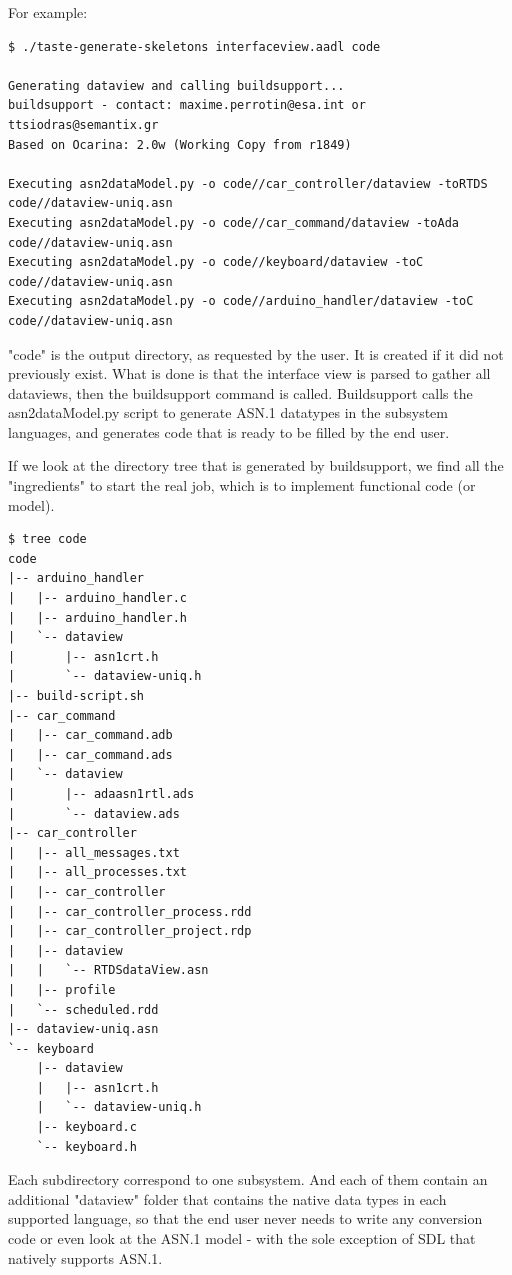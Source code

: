 \documentclass[11pt]{book}
\begin{document}
For example:

\begin{lstlisting}
$ ./taste-generate-skeletons interfaceview.aadl code

Generating dataview and calling buildsupport...
buildsupport - contact: maxime.perrotin@esa.int or ttsiodras@semantix.gr 
Based on Ocarina: 2.0w (Working Copy from r1849)

Executing asn2dataModel.py -o code//car_controller/dataview -toRTDS code//dataview-uniq.asn
Executing asn2dataModel.py -o code//car_command/dataview -toAda code//dataview-uniq.asn
Executing asn2dataModel.py -o code//keyboard/dataview -toC code//dataview-uniq.asn
Executing asn2dataModel.py -o code//arduino_handler/dataview -toC code//dataview-uniq.asn
\end{lstlisting}

"code" is the output directory, as requested by the user. It is created if it did not previously exist. What is done is that the interface view is parsed to gather all dataviews, then the buildsupport command is called. Buildsupport calls the asn2dataModel.py script to generate ASN.1 datatypes in the subsystem languages, and generates code that is ready to be filled by the end user.

If we look at the directory tree that is generated by buildsupport, we find all the "ingredients" to start the real job, which is to implement functional code (or model).

\begin{lstlisting}
$ tree code
code
|-- arduino_handler
|   |-- arduino_handler.c
|   |-- arduino_handler.h
|   `-- dataview
|       |-- asn1crt.h
|       `-- dataview-uniq.h
|-- build-script.sh
|-- car_command
|   |-- car_command.adb
|   |-- car_command.ads
|   `-- dataview
|       |-- adaasn1rtl.ads
|       `-- dataview.ads
|-- car_controller
|   |-- all_messages.txt
|   |-- all_processes.txt
|   |-- car_controller
|   |-- car_controller_process.rdd
|   |-- car_controller_project.rdp
|   |-- dataview
|   |   `-- RTDSdataView.asn
|   |-- profile
|   `-- scheduled.rdd
|-- dataview-uniq.asn
`-- keyboard
    |-- dataview
    |   |-- asn1crt.h
    |   `-- dataview-uniq.h
    |-- keyboard.c
    `-- keyboard.h
\end{lstlisting}

Each subdirectory correspond to one subsystem. And each of them contain an additional "dataview" folder that contains the native data types in each supported language, so that the end user never needs to write any conversion code or even look at the ASN.1 model - with the sole exception of SDL that natively supports ASN.1.
\end{document}
